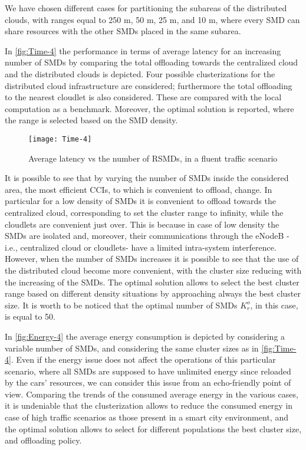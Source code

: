 \documentclass[twoside,openright]{report}
\begin{document}
We have chosen different cases for partitioning the subareas of the distributed clouds, with ranges equal to 250 m, 50 m, 25 m, and 10 m, where every \gls{SMD} can share resources  with the other \glspl{SMD} placed in the same subarea.

In \autoref{fig:Time-4} the performance in terms of average latency for an increasing number of \glspl{SMD} by comparing the total offloading towards the centralized cloud and the distributed clouds is depicted. Four possible clusterizations for the distributed cloud infrastructure are considered; furthermore the total offloading to the nearest cloudlet is also considered. These are compared with the local computation as a benchmark. Moreover, the optimal solution is reported, where the range is selected based on the \gls{SMD} density.

\begin{figure}[tbp]
\centering
\texttt{[image: Time-4]}
\caption{Average latency vs the number of RSMDs, in a fluent traffic scenario}
\label{fig:Time-4}
\end{figure}

It is possible to see that by varying the number of \glspl{SMD} inside the considered area, the most efficient \glspl{CCI}, to which is convenient to offload, change. In particular for a low density of \glspl{SMD} it is convenient to offload towards the centralized cloud, corresponding to set the cluster range to infinity, while the cloudlets are convenient just over. This is because in case of low density the \glspl{SMD} are isolated and, moreover, their communications through the eNodeB -i.e., centralized cloud or cloudlets- have a limited intra-system interference. However, when the number of \glspl{SMD} increases it is possible to see that the use of the distributed cloud become more convenient, with the cluster size reducing with the increasing of the \glspl{SMD}. The optimal solution allows to select the best cluster range based on different density situations by approaching always the best cluster size. It is worth to be noticed that the optimal number of \glspl{SMD} $K^o_r$, in this case, is equal to 50.

In \autoref{fig:Energy-4} the average energy consumption is depicted by considering a variable number of \glspl{SMD}, and considering the same cluster sizes as in \autoref{fig:Time-4}. Even if the energy issue does not affect the operations of this particular scenario, where all \glspl{SMD} are supposed to have unlimited energy since reloaded by the cars' resources, we can consider this issue from an echo-friendly point of view. Comparing the trends of the consumed average energy in the various cases, it is undeniable that the clusterization allows to reduce the consumed energy in case of high traffic scenarios as those present in a smart city environment, and the optimal solution allows to select for different populations the best cluster size, and offloading policy. 
\end{document}
